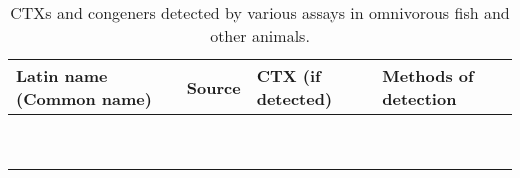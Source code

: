 \documentclass[12pt]{article}
\begin{document}
\begin{sidewaystable}[!htbp]
\caption{CTXs and congeners detected by various assays in omnivorous fish and other animals.}
\begin{tabular}{ |  p{4.5cm} | p{5cm} | p{4.5cm} | p{5cm} | }
\hline
\textbf{Latin name (Common name)} & \textbf{Source} & \textbf{CTX (if detected)} & \textbf{Methods of detection} \\
\hline
  &  &  & \\
\hline
  &  &  & \\
\hline
  &  &  & \\
\hline
  &  &  & \\
\hline
  &  &  & \\
\hline
  &  &  & \\
\hline
  &  &  & \\
\hline
  &  &  & \\
\hline
  &  &  & \\
\hline
\end{tabular}
\end{sidewaystable}
\end{document}
